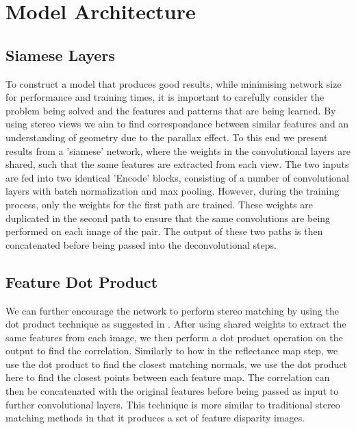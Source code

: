 \documentclass[ %
                    author={Gavin Parker},
                supervisor={Dr. Neill Campbell},
                    degree={MEng},
                     title={Deep Siamese Networks for Illumination Estimation from Stereo Images},
                  subtitle={},
                      type={research},
                      year={2018} ]{dissertation}
\begin{document}
\section{Model Architecture}
\subsection{Siamese Layers}
To construct a model that produces good results, while minimising network size for performance and training times, it is important to carefully consider the problem being solved and the features and patterns that are being learned. By using stereo views we aim to find correspondance between similar features and an understanding of geometry due to the parallax effect. To this end we present results from a 'siamese' network, where the weights in the convolutional layers are shared, such that the same features are extracted from each view. The two inputs are fed into two identical 'Encode' blocks, consisting of a number of convolutional layers with batch normalization and max pooling. However, during the training process, only the weights for the first path are trained. These weights are duplicated in the second path to ensure that the same convolutions are being performed on each image of the pair. The output of these two paths is then concatenated before being passed into the deconvolutional steps.
\subsection{Feature Dot Product}
We can further encourage the network to perform stereo matching by using the dot product technique as suggested in \cite{7780983}. After using shared weights to extract the same features from each image, we then perform a dot product operation on the output to find the correlation. Similarly to how in the reflectance map step, we use the dot product to find the closest matching normals, we use the dot product here to find the closest points between each feature map. The correlation can then be concatenated with the original features before being passed as input to further convolutional layers. This technique is more similar to traditional stereo matching methods in that it produces a set of feature disparity images.
\end{document}
